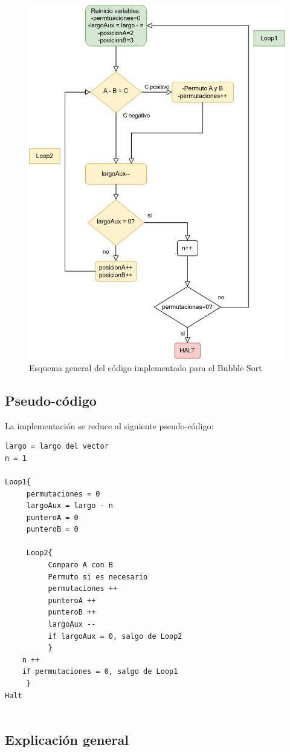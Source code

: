 \documentclass{sciposter}
\begin{document}
\begin{multicols*}{2}
\begin{figure}[H]
    \centering
    \includegraphics[width=0.7\linewidth]{Diagrama Bubble Sort.drawio.png}
    \caption{Esquema general del código implementado para el Bubble Sort}
    \label{fig:enter-label}
\end{figure}

\subsection{Pseudo-código}

La implementación se reduce al siguiente pseudo-código:

\begin{lstlisting}
largo = largo del vector
n = 1

Loop1{ 
     permutaciones = 0
     largoAux = largo - n
     punteroA = 0
     punteroB = 0

     Loop2{ 
          Comparo A con B
          Permuto si es necesario
          permutaciones ++
          punteroA ++
          punteroB ++
          largoAux --
          if largoAux = 0, salgo de Loop2
          }
    n ++
    if permutaciones = 0, salgo de Loop1
     }
Halt
    
\end{lstlisting}

\subsection{Explicación general}


\end{multicols*}
\end{document}
